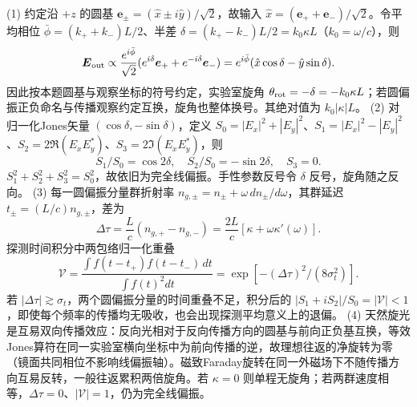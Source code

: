 (1) 约定沿 \(+z\) 的圆基 \(\boldsymbol e_\pm=(\hat x\pm i\hat y)/\sqrt2\)，故输入 \(\hat x=(\boldsymbol e_++\boldsymbol e_-)/\sqrt2\)。令平均相位 \(\bar\phi=(k_++k_-)L/2\)、半差 \(\delta=(k_+-k_-)L/2=k_0\kappa L\)（\(k_0=\omega/c\)），则
\[
\boldsymbol E_{\rm out}\propto\frac{e^{i\bar\phi}}{\sqrt2}(e^{i\delta}\boldsymbol e_++e^{-i\delta}\boldsymbol e_-)
=e^{i\bar\phi}(\hat x\cos\delta-\hat y\sin\delta).
\]
因此按本题圆基与观察坐标的符号约定，实验室旋角 \(\theta_{\rm rot}=-\delta=-k_0\kappa L\)；若圆偏振正负命名与传播观察约定互换，旋角也整体换号。其绝对值为 \(k_0|\kappa|L\)。
(2) 对归一化Jones矢量 \((\cos\delta,-\sin\delta)\)，定义 \(S_0=|E_x|^2+|E_y|^2\)、\(S_1=|E_x|^2-|E_y|^2\)、\(S_2=2\Re(E_xE_y^*)\)、\(S_3=2\Im(E_xE_y^*)\)，则
\[
S_1/S_0=\cos2\delta,\quad S_2/S_0=-\sin2\delta,\quad S_3=0.
\]
\(S_1^2+S_2^2+S_3^2=S_0^2\)，故依旧为完全线偏振。手性参数反号令 \(\delta\) 反号，旋角随之反向。
(3) 每一圆偏振分量群折射率 \(n_{g,\pm}=n_\pm+\omega\,dn_\pm/d\omega\)，其群延迟 \(t_\pm=(L/c)n_{g,\pm}\)，差为
\[
\Delta\tau=\frac Lc(n_{g,+}-n_{g,-})
=\frac{2L}{c}[\kappa+\omega\kappa'(\omega)].
\]
探测时间积分中两包络归一化重叠
\[
\mathcal V=\frac{\int f(t-t_+)f(t-t_-)\,dt}{\int f(t)^2dt}
=\exp[-(\Delta\tau)^2/(8\sigma_t^2)].
\]
若 \(|\Delta\tau|\gtrsim\sigma_t\)，两个圆偏振分量的时间重叠不足，积分后的 \(|S_1+iS_2|/S_0=|\mathcal V|<1\)，即使每个频率的传播均无吸收，也会出现探测平均意义上的退偏。
(4) 天然旋光是互易双向传播效应：反向光相对于反向传播方向的圆基与前向正负基互换，等效Jones算符在同一实验室横向坐标中为前向传播的逆，故理想往返的净旋转为零（镜面共同相位不影响线偏振轴）。磁致Faraday旋转在同一外磁场下不随传播方向互易反转，一般往返累积两倍旋角。若 \(\kappa=0\) 则单程无旋角；若两群速度相等，\(\Delta\tau=0\)、\(|\mathcal V|=1\)，仍为完全线偏振。
